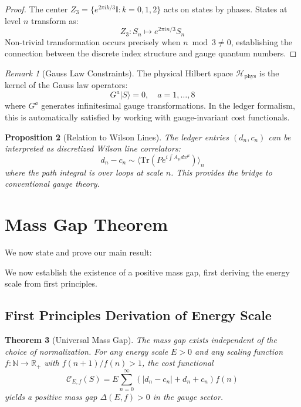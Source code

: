 \documentclass[11pt]{article}
\numberwithin{equation}{section}
\newtheorem{theorem}{Theorem}[section]
\newtheorem{proposition}[theorem]{Proposition}
\theoremstyle{definition}
\theoremstyle{remark}
\newtheorem{remark}[theorem]{Remark}
\begin{document}
\begin{proof}
The center $Z_3 = \{e^{2\pi i k/3} \mathbb{I} : k = 0,1,2\}$ acts on states by phases. States at level $n$ transform as:
\begin{equation}
Z_3: S_n \mapsto e^{2\pi i n/3} S_n
\end{equation}
Non-trivial transformation occurs precisely when $n \bmod 3 \neq 0$, establishing the connection between the discrete index structure and gauge quantum numbers.
\end{proof}

\begin{remark}[Gauss Law Constraints]
The physical Hilbert space $\mathcal{H}_{\text{phys}}$ is the kernel of the Gauss law operators:
\begin{equation}
G^a |S\rangle = 0, \quad a = 1,\ldots,8
\end{equation}
where $G^a$ generates infinitesimal gauge transformations. In the ledger formalism, this is automatically satisfied by working with gauge-invariant cost functionals.
\end{remark}

\begin{proposition}[Relation to Wilson Lines]
The ledger entries $(d_n, c_n)$ can be interpreted as discretized Wilson line correlators:
\begin{equation}
d_n - c_n \sim \langle \text{Tr}(P e^{i\int A_\mu dx^\mu}) \rangle_n
\end{equation}
where the path integral is over loops at scale $n$. This provides the bridge to conventional gauge theory.
\end{proposition}

\section{Mass Gap Theorem}

We now state and prove our main result:

We now establish the existence of a positive mass gap, first deriving the energy scale from first principles.

\subsection{First Principles Derivation of Energy Scale}

\begin{theorem}[Universal Mass Gap]
The mass gap exists independent of the choice of normalization. For any energy scale $E > 0$ and any scaling function $f: \mathbb{N} \to \mathbb{R}_+$ with $f(n+1)/f(n) > 1$, the cost functional
\begin{equation}
\mathcal{C}_{E,f}(S) = E \sum_{n=0}^{\infty} \left(|d_n - c_n| + d_n + c_n\right) f(n)
\end{equation}
yields a positive mass gap $\Delta(E,f) > 0$ in the gauge sector.
\end{theorem}
\end{document}
